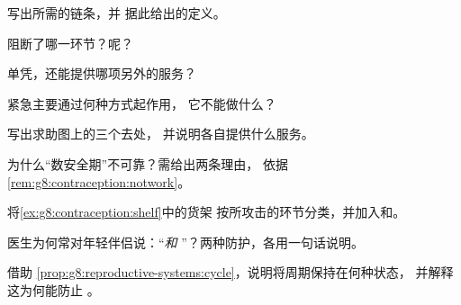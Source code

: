 \begin{exercise}[$\star$]\label{exo:g8:contraception:1}
写出所需的链条，并
据此给出的定义。
\end{exercise}

\begin{exercise}[$\star$]\label{exo:g8:contraception:2}
阻断了哪一环节？呢？
\end{exercise}

\begin{exercise}[$\star$]\label{exo:g8:contraception:3}
单凭，还能提供哪项另外的服务？
\end{exercise}

\begin{exercise}[$\star$]\label{exo:g8:contraception:4}
紧急主要通过何种方式起作用，
它不能做什么？
\end{exercise}

\begin{exercise}[$\star$]\label{exo:g8:contraception:5}
写出求助图上的三个去处，
并说明各自提供什么服务。
\end{exercise}

\begin{exercise}[$\star$]\label{exo:g8:contraception:6}
为什么“数安全期”不可靠？需给出两条理由，
依据\cref{rem:g8:contraception:notwork}。
\end{exercise}

\begin{exercise}[$\star\star$]\label{exo:g8:contraception:7}
将\cref{ex:g8:contraception:shelf}中的货架
按所攻击的环节分类，并加入和。
\end{exercise}

\begin{exercise}[$\star\star$]\label{exo:g8:contraception:8}
医生为何常对年轻伴侣说：“\emph{和}
”？两种防护，各用一句话说明。
\end{exercise}

\begin{exercise}[$\star\star$]\label{exo:g8:contraception:9}
借助
\cref{prop:g8:reproductive-systems:cycle}，说明将周期保持在何种状态，
并解释这为何能防止
。
\end{exercise}

